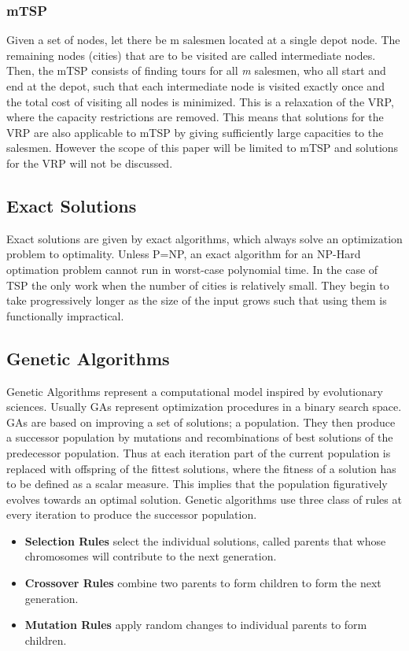 \documentclass[11pt]{article}
\begin{document}
\subsubsection{mTSP}
Given a set of nodes, let there be m salesmen located at a single depot node. The remaining nodes (cities) that are to be visited are called intermediate nodes. Then, the mTSP consists of finding tours for all \textit{m} salesmen, who all start and end at the depot, such that each intermediate node is visited exactly once and the total cost of visiting all nodes is minimized. This is a relaxation of the VRP, where the capacity restrictions are removed. This means that solutions for the VRP are also applicable to mTSP by giving sufficiently large capacities to the salesmen. However the scope of this paper will be limited to mTSP and solutions for the VRP will not be discussed.

\subsection{Exact Solutions}
Exact solutions are given by exact algorithms, which always solve an optimization problem to optimality. Unless P=NP, an exact algorithm for an NP-Hard optimation problem cannot run in worst-case polynomial time. In the case of TSP the only work when the number of cities is relatively small. They begin to take progressively longer as the size of the input grows such that using them is functionally impractical. 

\subsection{Genetic Algorithms}
Genetic Algorithms represent a computational model inspired by evolutionary sciences. Usually GAs represent optimization procedures in a binary search space. GAs are based on improving a set of solutions; a population. They then produce a successor population by mutations and recombinations of best solutions of the predecessor population. Thus at each iteration part of the current population is replaced with offspring of the fittest solutions, where the fitness of a solution has to be defined as a scalar measure. This implies that the population figuratively evolves towards an optimal solution. Genetic algorithms use three class of rules at every iteration to produce the successor population.
\begin{itemize}
  \item \textbf{Selection Rules} select the individual solutions, called parents that whose chromosomes will contribute to the next generation.
  \item \textbf{Crossover Rules} combine two parents to form children to form the next generation.
	\item \textbf{Mutation Rules} apply random changes to individual parents to form children.
\end{itemize}
\end{document}

